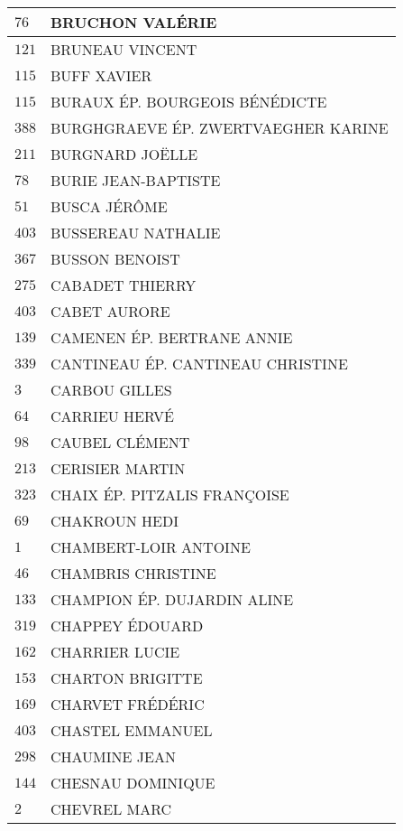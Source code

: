 \begin{xltabular}{\linewidth}{|l|X|}
    \hline
    $76$ & BRUCHON VALÉRIE \\
    \hline
    $121$ & BRUNEAU VINCENT \\
    \hline
    $115$ & BUFF XAVIER \\
    \hline
    $115$ & BURAUX ÉP. BOURGEOIS BÉNÉDICTE \\
    \hline
    $388$ & BURGHGRAEVE ÉP. ZWERTVAEGHER KARINE \\
    \hline
    $211$ & BURGNARD JOËLLE \\
    \hline
    $78$ & BURIE JEAN-BAPTISTE \\
    \hline
    $51$ & BUSCA JÉRÔME \\
    \hline
    $403$ & BUSSEREAU NATHALIE \\
    \hline
    $367$ & BUSSON BENOIST \\
    \hline
    $275$ & CABADET THIERRY \\
    \hline
    $403$ & CABET AURORE \\
    \hline
    $139$ & CAMENEN ÉP. BERTRANE ANNIE \\
    \hline
    $339$ & CANTINEAU ÉP. CANTINEAU CHRISTINE \\
    \hline
    $3$ & CARBOU GILLES \\
    \hline
    $64$ & CARRIEU HERVÉ \\
    \hline
    $98$ & CAUBEL CLÉMENT \\
    \hline
    $213$ & CERISIER MARTIN \\
    \hline
    $323$ & CHAIX ÉP. PITZALIS FRANÇOISE \\
    \hline
    $69$ & CHAKROUN HEDI \\
    \hline
    $1$ & CHAMBERT-LOIR ANTOINE \\
    \hline
    $46$ & CHAMBRIS CHRISTINE \\
    \hline
    $133$ & CHAMPION ÉP. DUJARDIN ALINE \\
    \hline
    $319$ & CHAPPEY ÉDOUARD \\
    \hline
    $162$ & CHARRIER LUCIE \\
    \hline
    $153$ & CHARTON BRIGITTE \\
    \hline
    $169$ & CHARVET FRÉDÉRIC \\
    \hline
    $403$ & CHASTEL EMMANUEL \\
    \hline
    $298$ & CHAUMINE JEAN \\
    \hline
    $144$ & CHESNAU DOMINIQUE \\
    \hline
    $2$ & CHEVREL MARC \\

\end{xltabular}
